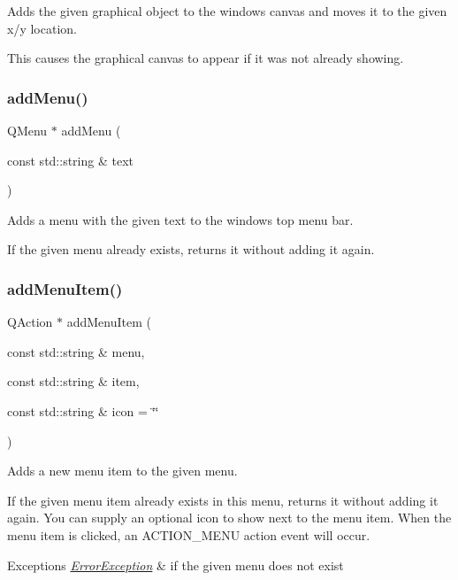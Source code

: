 Adds the given graphical object to the window\textquotesingle{}s canvas and moves it to the given x/y location. 

This causes the graphical canvas to appear if it was not already showing. \mbox{\label{classGWindow_afffea482963d5566e97ccccb1f94a4e2}} 
\subsubsection{\texorpdfstring{add\+Menu()}{addMenu()}}
{\footnotesize\ttfamily Q\+Menu $\ast$ add\+Menu (\begin{DoxyParamCaption}\item[{const std\+::string \&}]{text }\end{DoxyParamCaption})\hspace{0.3cm}{\ttfamily [virtual]}}



Adds a menu with the given text to the window\textquotesingle{}s top menu bar. 

If the given menu already exists, returns it without adding it again. \mbox{\label{classGWindow_a43efd24277d68e749443cb7c36b65f4b}} 
\subsubsection{\texorpdfstring{add\+Menu\+Item()}{addMenuItem()}\hspace{0.1cm}{\footnotesize\ttfamily [1/2]}}
{\footnotesize\ttfamily Q\+Action $\ast$ add\+Menu\+Item (\begin{DoxyParamCaption}\item[{const std\+::string \&}]{menu,  }\item[{const std\+::string \&}]{item,  }\item[{const std\+::string \&}]{icon = {\ttfamily \char`\"{}\char`\"{}} }\end{DoxyParamCaption})\hspace{0.3cm}{\ttfamily [virtual]}}



Adds a new menu item to the given menu. 

If the given menu item already exists in this menu, returns it without adding it again. You can supply an optional icon to show next to the menu item. When the menu item is clicked, an A\+C\+T\+I\+O\+N\+\_\+\+M\+E\+NU action event will occur. 
\begin{DoxyExceptions}{Exceptions}
{\em \mbox{\hyperlink{classErrorException}{Error\+Exception}}} & if the given menu does not exist \\
\hline
\end{DoxyExceptions}
\mbox{\label{classGWindow_ad57e2955efbfb5a0cccc981332945c8e}} 
